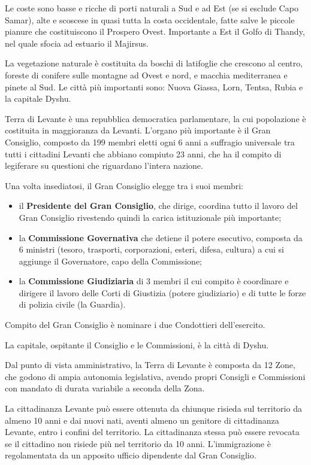 Le coste sono basse e ricche di porti naturali a Sud e ad Est (se si
esclude Capo Samar), alte e scoscese in quasi tutta la costa
occidentale, fatte salve le piccole pianure che costituiscono il
Prospero Ovest. Importante a Est il Golfo di Thandy, nel quale sfocia
ad estuario il Majirsus.

La vegetazione naturale \`e costituita da boschi di latifoglie che
crescono al centro, foreste di conifere sulle montagne ad Ovest e
nord, e macchia mediterranea e pinete al Sud. Le citt\`a pi\`u
importanti sono: Nuova Giassa, Lorn, Tentsa, Rubia e la capitale
Dyshu.

\Politica Terra di Levante \`e una repubblica democratica
parlamentare, la cui popolazione \`e costituita in maggioranza da
Levanti. L'organo pi\`u importante \`e il Gran Consiglio, composto da
199 membri eletti ogni 6 anni a suffragio universale tra tutti i
cittadini Levanti che abbiano compiuto 23 anni, che ha il compito di
legiferare su questioni che riguardano l'intera nazione.

\iffullversion
Una volta insediatosi, il Gran Consiglio elegge tra i suoi membri: 

\begin{itemize}\itemsep -3pt
\item il \textbf{Presidente del Gran Consiglio}, che dirige, coordina tutto il
  lavoro del Gran Consiglio rivestendo quindi la carica istituzionale
  pi\`u importante;
\item la \textbf{Commissione Governativa} che detiene il potere esecutivo,
  composta da 6 ministri (tesoro, trasporti, corporazioni, esteri,
  difesa, cultura) a cui si aggiunge il Governatore, capo della
  Commissione;
\item la \textbf{Commissione Giudiziaria} di 3 membri il cui compito \`e
  coordinare e dirigere il lavoro delle Corti di Giustizia (potere
  giudiziario) e di tutte le forze di polizia civile (la Guardia).
\end{itemize}
\fi

Compito del Gran Consiglio \`e nominare i due Condottieri
dell'esercito.

\iffullversion
La capitale, ospitante il Consiglio e le Commissioni, \`e la citt\`a di
Dyshu.

Dal punto di vista amministrativo, la Terra di Levante \`e composta da
12 Zone, che godono di ampia autonomia legislativa, avendo propri
Consigli e Commissioni con mandato di durata variabile a seconda della
Zona.

La cittadinanza Levante pu\`o essere ottenuta da chiunque risieda sul
territorio da almeno 10 anni e dai nuovi nati, aventi almeno un
genitore di cittadinanza Levante, entro i confini del territorio. La
cittadinanza stessa pu\`o essere revocata se il cittadino non risiede
pi\`u nel territorio da 10 anni. L'immigrazione \`e regolamentata da
un apposito ufficio dipendente dal Gran Consiglio.

